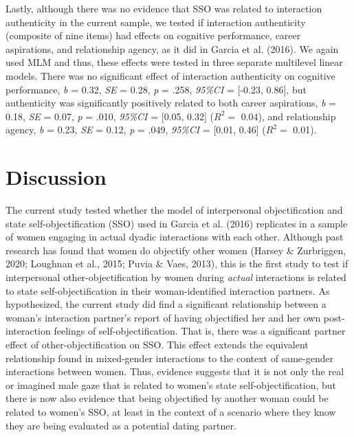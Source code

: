 \documentclass[man]{apa6}
\begin{document}
Lastly, although there was no evidence that SSO was related to
interaction authenticity in the current sample, we tested if interaction
authenticity (composite of nine items) had effects on cognitive
performance, career aspirations, and relationship agency, as it did in
Garcia et al. (2016). We again used MLM and thus, these effects were
tested in three separate multilevel linear models. There was no
significant effect of interaction authenticity on cognitive performance,
\emph{b} = 0.32, \emph{SE} = 0.28, \emph{p} = .258, \emph{95\%CI} =
{[}-0.23, 0.86{]}, but authenticity was significantly positively related
to both career aspirations, \emph{b} = 0.18, \emph{SE} = 0.07, \emph{p}
= .010, \emph{95\%CI} = {[}0.05, 0.32{]} (\(R^2 =\) 0.04), and
relationship agency, \emph{b} = 0.23, \emph{SE} = 0.12, \emph{p} = .049,
\emph{95\%CI} = {[}0.01, 0.46{]} (\(R^2 =\) 0.01).

\section{Discussion}\label{discussion}

The current study tested whether the model of interpersonal
objectification and state self-objectification (SSO) used in Garcia et
al. (2016) replicates in a sample of women engaging in actual dyadic
interactions with each other. Although past research has found that
women do objectify other women (Harsey \& Zurbriggen, 2020; Loughnan et
al., 2015; Puvia \& Vaes, 2013), this is the first study to test if
interpersonal other-objectification by women during \emph{actual}
interactions is related to state self-objectification in their
woman-identified interaction partners. As hypothesized, the current
study did find a significant relationship between a woman's interaction
partner's report of having objectified her and her own post-interaction
feelings of self-objectification. That is, there was a significant
partner effect of other-objectification on SSO. This effect extends the
equivalent relationship found in mixed-gender interactions to the
context of same-gender interactions between women. Thus, evidence
suggests that it is not only the real or imagined male gaze that is
related to women's state self-objectification, but there is now also
evidence that being objectified by another woman could be related to
women's SSO, at least in the context of a scenario where they know they
are being evaluated as a potential dating partner.
\end{document}
